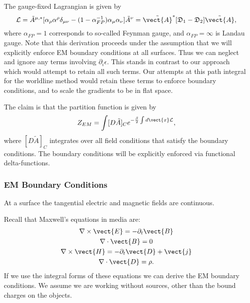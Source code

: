 The gauge-fixed Lagrangian is given by
\begin{equation}
  \mathcal{L}=\tilde{A}^{\mu,*} [\alpha_\rho\alpha^\rho\delta_{\mu\nu}
  -(1-\alpha^{-1}_{FP})\alpha_\mu\alpha_\nu]\tilde{A}^\nu
=\tilde{\vect{A}}^{*}[\mathfrak{D}_1-\mathfrak{D}_2]\tilde{\vect{A}},
\end{equation}
where $\alpha_{FP}=1$ corresponds to so-called Feynman gauge, and $\alpha_{FP}=\infty$ is Landau gauge.
Note that this derivation proceeds under the assumption that we will  explicitly enforce 
EM boundary conditions at all surfaces.  Thus we can neglect and ignore any terms involving
$\partial_i\epsilon$.   This stands in contrast to our approach which would attempt to retain 
all such terms.  Our attempts at this path integral for the worldline method would retain these
terms to enforce boundary conditions, and to scale the gradients to be in flat space.  

The claim is that the partition function is given by 
\begin{equation}
  Z_{EM} = \int [D\tilde{A}]_C e^{-\frac{\beta}{2}\int d\vect{x} \mathcal{L}},
\end{equation}
where $[D\tilde{A}]_C$ integrates over all field conditions that satisfy the boundary conditions.
The boundary conditions will be explicitly enforced via functional delta-functions.  

\subsubsection{EM Boundary Conditions}

At a surface the tangential electric and magnetic fields are continuous.

Recall that Maxwell's equations in media are:
\begin{gather}
  \nabla\times \vect{E} =-\partial_t \vect{B}\\
  \nabla\cdot\vect{B}=0\\
  \nabla\times\vect{H} = -\partial_t \vect{D} +\vect{j}\\
  \nabla\cdot\vect{D} =\rho.
\end{gather}
If we use the integral forms of these equations we can derive the EM boundary conditions.
We assume we are working without sources, other than the bound charges on the objects.  


